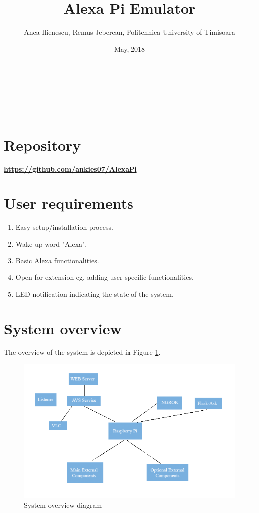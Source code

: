 \documentclass[a4paper,11pt]{article}
\makeatletter
\newcommand{\divider}{\rule{\linewidth}{0.5pt}}
\renewcommand{\maketitle}{
\begin{center}
\vspace{2ex}
{\huge \textsc{\@title}}
\vspace{1ex}
\\
\divider\\
\@author \hfill \@date
\vspace{4ex}
\end{center}
}
\makeatother
\begin{document}
\title{Alexa Pi Emulator}

\author{Anca Ilienescu, Remus Jeberean, Politehnica University of Timisoara}

\date{May, 2018}

\maketitle

\section{Repository}
\textbf{\url{https://github.com/ankies07/AlexaPi}}

\section{User requirements}

\begin{enumerate}  
\item Easy setup/installation process.
\item Wake-up word "Alexa".
\item Basic Alexa functionalities.
\item Open for extension eg. adding user-specific functionalities. 
\item LED notification indicating the state of the system.
\end{enumerate}

\section{System overview}

The overview of the system is depicted in Figure \ref{fig:system}.

 \begin{figure}[h]
 \centering
  \includegraphics[scale=0.5]{PIC1.png}
 \caption{System overview diagram}
  \label{fig:system}
 \end{figure}
\end{document}

